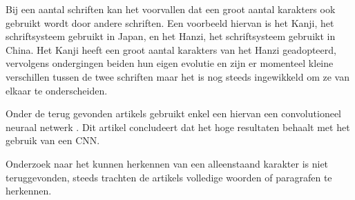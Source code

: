 Bij een aantal schriften kan het voorvallen dat een groot aantal karakters ook gebruikt wordt door andere schriften.
Een voorbeeld hiervan is het Kanji, het schriftsysteem gebruikt in Japan, en het Hanzi, het schriftsysteem gebruikt in China.
Het Kanji heeft een groot aantal karakters van het Hanzi geadopteerd, vervolgens ondergingen beiden hun eigen evolutie en zijn er momenteel kleine verschillen tussen de twee schriften maar het is nog steeds ingewikkeld om ze van elkaar te onderscheiden. \autocite{Koichi2010}

Onder de terug gevonden artikels gebruikt enkel een hiervan een convolutioneel neuraal netwerk \textcite{Baoguang2015}.
Dit artikel concludeert dat het hoge resultaten behaalt met het gebruik van een CNN.

Onderzoek naar het kunnen herkennen van een alleenstaand karakter is niet teruggevonden, steeds trachten de artikels volledige woorden of paragrafen te herkennen.


















